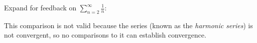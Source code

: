 \documentclass{ximera}
\begin{document}
\begin{exercise}
\begin{feedback}
Expand for feedback on {$\displaystyle \sum_{n=2}^\infty \frac{1}{n}$}:
\begin{expandable}
This comparison is not valid because the series (known as the \textit{harmonic series}) is not convergent, so no comparisons to it can establish convergence.
\end{expandable}
\end{feedback}
\end{exercise}
\end{document}
